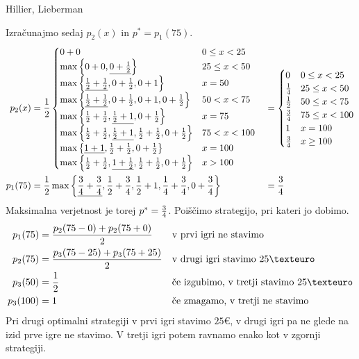 \begin{naloga}{Hillier, Lieberman}{\cite[Problem~11.4-1]{hl}}
\begin{odgovor}
Izračunajmo sedaj $p_2(x)$ in $p^* = p_1(75)$.
\begin{alignat*}{2}
p_2(x) &= {1 \over 2} \begin{cases}
0+0 & 0 \le x < 25 \\
\max\left\{0+0, \underline{0+{1 \over 2}}\right\} & 25 \le x < 50 \\
\max\left\{\underline{{1 \over 2}+{1 \over 2}}, 0+{1 \over 2},
           0+1\right\} & x = 50 \\
\max\left\{\underline{{1 \over 2}+{1 \over 2}}, 0+{1 \over 2},
           0+1, 0+{1 \over 2}\right\} & 50 < x < 75 \\
\max\left\{{1 \over 2}+{1 \over 2}, \underline{{1 \over 2}+1},
           0+{1 \over 2}\right\} & x = 75 \\
\max\left\{{1 \over 2}+{1 \over 2}, \underline{{1 \over 2}+1},
           {1 \over 2}+{1 \over 2}, 0+{1 \over 2}\right\} & 75 < x < 100 \\
\max\left\{\underline{1+1}, {1 \over 2}+{1 \over 2},
           0+{1 \over 2}\right\} & x = 100 \\
\max\left\{{1 \over 2}+{1 \over 2}, \underline{1+{1 \over 2}},
           {1 \over 2}+{1 \over 2}, 0+{1 \over 2}\right\} & x > 100
\end{cases}
&&= \begin{cases}
0 & 0 \le x < 25 \\
{1 \over 4} & 25 \le x < 50 \\
{1 \over 2} & 50 \le x < 75 \\
{3 \over 4} & 75 \le x < 100 \\
1 & x = 100 \\
{3 \over 4} & x \ge 100
\end{cases} \\
p_1(75) &= {1 \over 2} \max\left\{\underline{{3 \over 4}+{3 \over 4}},
                                  {1 \over 2}+{3 \over 4},
                                  {1 \over 2}+1,
                                  {1 \over 4}+{3 \over 4},
                                  0+{3 \over 4}\right\} &&= {3 \over 4}
\end{alignat*}
Maksimalna verjetnost je torej $p^* = {3 \over 4}$.
Poiščimo strategijo, pri kateri jo dobimo.
\begin{align*}
p_1(75) &= {p_2(75-0) + p_2(75+0) \over 2}
&& \text{v prvi igri ne stavimo} \\
p_2(75) &= {p_3(75-25) + p_3(75+25) \over 2}
&& \text{v drugi igri stavimo $25 €$} \\
p_3(50) &= {1 \over 2}
&& \text{če izgubimo, v tretji stavimo $25 €$} \\
p_3(100) &= 1
&& \text{če zmagamo, v tretji ne stavimo}
\end{align*}
Pri drugi optimalni strategiji v prvi igri stavimo $25 €$,
v drugi igri pa ne glede na izid prve igre ne stavimo.
V tretji igri potem ravnamo enako kot v zgornji strategiji.
\end{odgovor}
\end{naloga}
